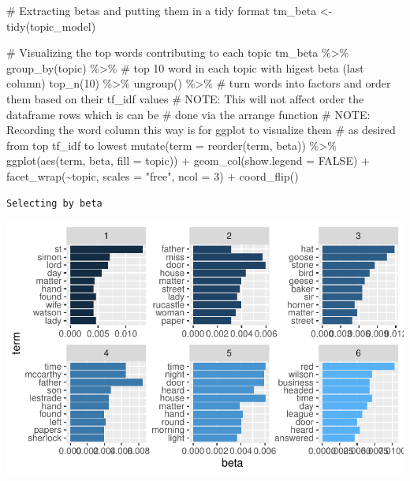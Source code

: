 \documentclass[
  letterpaper,
  DIV=11,
  numbers=noendperiod]{scrreprt}
\newenvironment{Shaded}{\begin{snugshade}}{\end{snugshade}}
\newcommand{\AlertTok}[1]{\textcolor[rgb]{0.68,0.00,0.00}{#1}}
\newcommand{\AttributeTok}[1]{\textcolor[rgb]{0.40,0.45,0.13}{#1}}
\newcommand{\CommentTok}[1]{\textcolor[rgb]{0.37,0.37,0.37}{#1}}
\newcommand{\ConstantTok}[1]{\textcolor[rgb]{0.56,0.35,0.01}{#1}}
\newcommand{\DecValTok}[1]{\textcolor[rgb]{0.68,0.00,0.00}{#1}}
\newcommand{\FunctionTok}[1]{\textcolor[rgb]{0.28,0.35,0.67}{#1}}
\newcommand{\NormalTok}[1]{\textcolor[rgb]{0.00,0.23,0.31}{#1}}
\newcommand{\OtherTok}[1]{\textcolor[rgb]{0.00,0.23,0.31}{#1}}
\newcommand{\SpecialCharTok}[1]{\textcolor[rgb]{0.37,0.37,0.37}{#1}}
\newcommand{\StringTok}[1]{\textcolor[rgb]{0.13,0.47,0.30}{#1}}
\begin{document}
\begin{Shaded}
\begin{Highlighting}[]
\CommentTok{\# Extracting betas and putting them in a tidy format}
\NormalTok{tm\_beta }\OtherTok{\textless{}{-}} \FunctionTok{tidy}\NormalTok{(topic\_model)}

\CommentTok{\# Visualizing the top words contributing to each topic}
\NormalTok{tm\_beta }\SpecialCharTok{\%\textgreater{}\%} 
  \FunctionTok{group\_by}\NormalTok{(topic) }\SpecialCharTok{\%\textgreater{}\%} 
  \CommentTok{\# top 10 word in each topic with higest beta (last column)}
  \FunctionTok{top\_n}\NormalTok{(}\DecValTok{10}\NormalTok{) }\SpecialCharTok{\%\textgreater{}\%} 
  \FunctionTok{ungroup}\NormalTok{() }\SpecialCharTok{\%\textgreater{}\%} 
  \CommentTok{\# turn words into factors and order them based on their tf\_idf values}
  \CommentTok{\# }\AlertTok{NOTE}\CommentTok{: This will not affect order the dataframe rows which is can be}
  \CommentTok{\#   done via the arrange function}
  \CommentTok{\# }\AlertTok{NOTE}\CommentTok{: Recording the word column this way is for ggplot to visualize them}
  \CommentTok{\#   as desired from top tf\_idf to lowest}
  \FunctionTok{mutate}\NormalTok{(}\AttributeTok{term =} \FunctionTok{reorder}\NormalTok{(term, beta)) }\SpecialCharTok{\%\textgreater{}\%} 
  \FunctionTok{ggplot}\NormalTok{(}\FunctionTok{aes}\NormalTok{(term, beta, }\AttributeTok{fill =}\NormalTok{ topic)) }\SpecialCharTok{+}
  \FunctionTok{geom\_col}\NormalTok{(}\AttributeTok{show.legend =} \ConstantTok{FALSE}\NormalTok{) }\SpecialCharTok{+}
  \FunctionTok{facet\_wrap}\NormalTok{(}\SpecialCharTok{\textasciitilde{}}\NormalTok{topic, }\AttributeTok{scales =} \StringTok{"free"}\NormalTok{, }\AttributeTok{ncol =} \DecValTok{3}\NormalTok{) }\SpecialCharTok{+}
  \FunctionTok{coord\_flip}\NormalTok{()}
\end{Highlighting}
\end{Shaded}

\begin{verbatim}
Selecting by beta
\end{verbatim}

\includegraphics{src/projects/topic-modeling-r_files/figure-pdf/unnamed-chunk-9-1.pdf}
\end{document}
